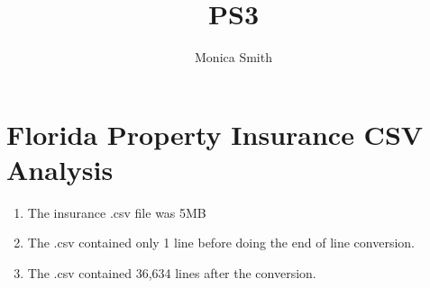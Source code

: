 \documentclass{article}
\title{PS3}
\author{Monica Smith}
\begin{document}
\maketitle

\section{Florida Property Insurance CSV Analysis}

\begin{enumerate}
    \item The insurance .csv file was 5MB
    \item The .csv contained only 1 line before doing the end of line conversion.
    \item The .csv contained 36,634 lines after the conversion.
\end{enumerate}
\end{document}
